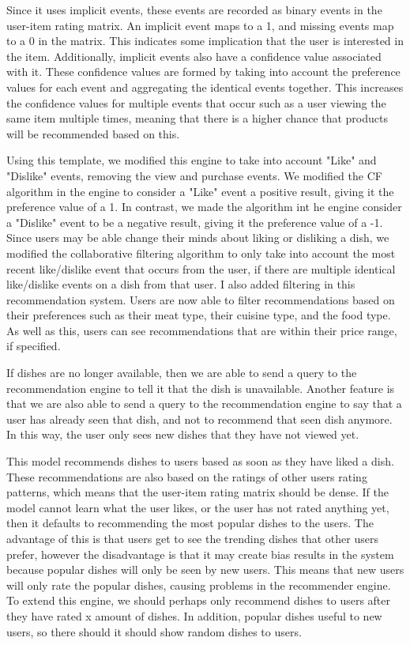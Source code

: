 Since it uses implicit events, these events are recorded as binary events in the user-item rating matrix. An implicit event maps to a 1, and missing events map to a 0 in the matrix. This indicates some implication that the user is interested in the item. Additionally, implicit events also have a confidence value associated with it. These confidence values are formed by taking into account the preference values for each event and aggregating the identical events together. This increases the confidence values for multiple events that occur such as a user viewing the same item multiple times, meaning that there is a higher chance that products will be recommended based on this. 

Using this template, we modified this engine to take into account "Like" and "Dislike" events, removing the view and purchase events. We modified the CF algorithm in the engine to consider a "Like" event a positive result, giving it the preference value of a 1. In contrast, we made the algorithm int he engine consider a "Dislike" event to be a negative result, giving it the preference value of a -1. Since users may be able change their minds about liking or disliking a dish, we modified the collaborative filtering algorithm to only take into account the most recent like/dislike event that occurs from the user, if there are multiple identical like/dislike events on a dish from that user. I also added filtering in this recommendation system. Users are now able to filter recommendations based on their preferences such as their meat type, their cuisine type, and the food type. As well as this, users can see recommendations that are within their price range, if specified. 

If dishes are no longer available, then we are able to send a query to the recommendation engine to tell it that the dish is unavailable. Another feature is that we are also able to send a query to the recommendation engine to say that a user has already seen that dish, and not to recommend that seen dish anymore. In this way, the user only sees new dishes that they have not viewed yet.


This model recommends dishes to users based as soon as they have liked a dish. These recommendations are also based on the ratings of other users rating patterns, which means that the user-item rating matrix should be dense. If the model cannot learn what the user likes, or the user has not rated anything yet, then it defaults to recommending the most popular dishes to the users. The advantage of this is that users get to see the trending dishes that other users prefer, however the disadvantage is that it may create bias results in the system because popular dishes will only be seen by new users. This means that new users will only rate the popular dishes, causing problems in the recommender engine. To extend this engine, we should perhaps only recommend dishes to users after they have rated x amount of dishes. In addition, popular dishes useful to new users, so there should it should show random dishes to users. 
